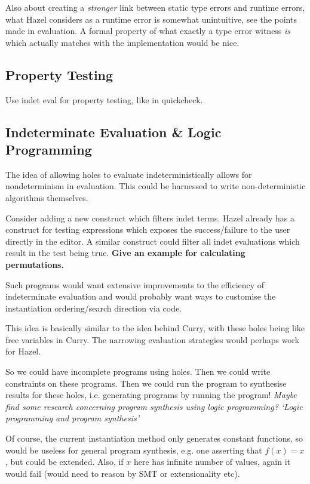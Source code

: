 Also about creating a \textit{stronger} link between static type errors and runtime errors, what Hazel considers as a runtime error is somewhat unintuitive, see the points made in evaluation. A formal property of what exactly a type error witness \textit{is} which actually matches with the implementation would be nice.

\subsection{Property Testing}
Use indet eval for property testing, like in quickcheck.

\subsection{Indeterminate Evaluation \& Logic Programming}
\label{sec:LogicProgramming}
The idea of allowing holes to evaluate indeterministically allows for nondeterminism in evaluation. This could be harnessed to write non-deterministic algorithms themselves.

Consider adding a new construct which filters indet terms. Hazel already has a construct for testing expressions which exposes the success/failure to the user directly in the editor. A similar construct could filter all indet evaluations which result in the test being true. \textbf{Give an example for calculating permutations.}

Such programs would want extensive improvements to the efficiency of indeterminate evaluation and would probably want ways to customise the instantiation ordering/search direction via code.

This idea is basically similar to the idea behind Curry, with these holes being like free variables in Curry. The narrowing evaluation strategies would perhaps work for Hazel.

So we could have incomplete programs using holes. Then we could write constraints on these programs. Then we could run the program to synthesise results for these holes, i.e. generating programs by running the program! \textit{Maybe find some research concerning program synthesis using logic programming? `Logic programming and program synthesis'}

Of course, the current instantiation method only generates constant functions, so would be useless for general program synthesis, e.g. one asserting that $f(x) = x$, but could be extended. Also, if $x$ here has infinite number of values, again it would fail (would need to reason by SMT or extensionality etc).

